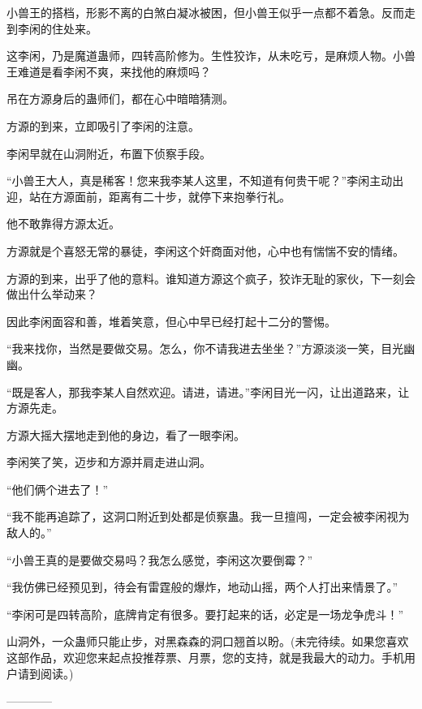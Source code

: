 \begin{this_body}
小兽王的搭档，形影不离的白煞白凝冰被困，但小兽王似乎一点都不着急。反而走到李闲的住处来。

这李闲，乃是魔道蛊师，四转高阶修为。生性狡诈，从未吃亏，是麻烦人物。小兽王难道是看李闲不爽，来找他的麻烦吗？

吊在方源身后的蛊师们，都在心中暗暗猜测。

方源的到来，立即吸引了李闲的注意。

李闲早就在山洞附近，布置下侦察手段。

“小兽王大人，真是稀客！您来我李某人这里，不知道有何贵干呢？”李闲主动出迎，站在方源面前，距离有二十步，就停下来抱拳行礼。

他不敢靠得方源太近。

方源就是个喜怒无常的暴徒，李闲这个奸商面对他，心中也有惴惴不安的情绪。

方源的到来，出乎了他的意料。谁知道方源这个疯子，狡诈无耻的家伙，下一刻会做出什么举动来？

因此李闲面容和善，堆着笑意，但心中早已经打起十二分的警惕。

“我来找你，当然是要做交易。怎么，你不请我进去坐坐？”方源淡淡一笑，目光幽幽。

“既是客人，那我李某人自然欢迎。请进，请进。”李闲目光一闪，让出道路来，让方源先走。

方源大摇大摆地走到他的身边，看了一眼李闲。

李闲笑了笑，迈步和方源并肩走进山洞。

“他们俩个进去了！”

“我不能再追踪了，这洞口附近到处都是侦察蛊。我一旦擅闯，一定会被李闲视为敌人的。”

“小兽王真的是要做交易吗？我怎么感觉，李闲这次要倒霉？”

“我仿佛已经预见到，待会有雷霆般的爆炸，地动山摇，两个人打出来情景了。”

“李闲可是四转高阶，底牌肯定有很多。要打起来的话，必定是一场龙争虎斗！”

山洞外，一众蛊师只能止步，对黑森森的洞口翘首以盼。(未完待续。如果您喜欢这部作品，欢迎您来起点投推荐票、月票，您的支持，就是我最大的动力。手机用户请到阅读。)

------------

\end{this_body}

